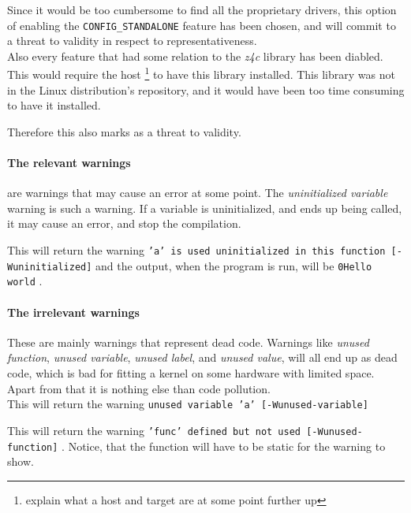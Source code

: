 \documentclass[a4paper,11pt]{article}
\newcommand{\textcode}[1]{
    \fboxsep=1pt
    \texttt{\colorbox{gray!20}{#1}}
}
\begin{document}
Since it would be too cumbersome to find all the proprietary drivers, this 
option of enabling the \textcode{CONFIG\_STANDALONE} feature has been chosen, 
and will commit to a threat to validity in respect to representativeness.
\\

Also every feature that had some relation to the \emph{z4c} library has been 
diabled. This would require the host \footnote{explain what a host and target 
are at some point further up} to have this library installed. This library was 
not in the Linux distribution's repository, and it would have been too time 
consuming to have it installed. 

Therefore this also marks as a threat to validity.


\paragraph{The relevant warnings}
are warnings that may cause an error at some point. The \emph{uninitialized 
variable} warning is such a warning. If a variable is uninitialized, and ends 
up being called, it may cause an error, and stop the compilation.



This will return the warning \textcode{'a' is used uninitialized in this 
function [-Wuninitialized]} and the output, when the program is run, will
be \textcode{0Hello world}.

\paragraph{The irrelevant warnings}
These are mainly warnings that represent dead code. Warnings like \emph{unused 
function}, \emph{unused variable}, \emph{unused label}, and \emph{unused 
value}, will all end up as dead code, which is bad for fitting a kernel 
on some hardware with limited space. Apart from that it is nothing else than 
code pollution. 
\\



This will return the warning \textcode{unused variable 'a' [-Wunused-variable]}




This will return the warning \textcode{'func' defined but not used 
[-Wunused-function]}. Notice, that the function will have to be static for the 
warning to show.
\end{document}
